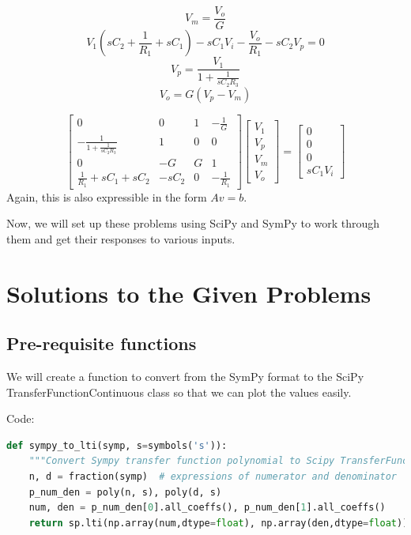 \documentclass[12pt]{article}
\begin{document}
\begin{equation}
    V_m = \frac{V_o}{G}
\end{equation}
\begin{equation}
    V_1 \left(sC_2 + \frac{1}{R_1} +sC_1 \right) - s C_1 V_i - \frac{V_o}{R_1} - s C_2 V_p = 0
\end{equation}
\begin{equation}
    V_p = \frac{V_1}{1+\frac{1}{s C_2 R_3}}
\end{equation}
\begin{equation}
    V_o = G(V_p - V_m)
\end{equation}

\begin{equation}
\begin{bmatrix}
    0 & 0 & 1 & -\frac{1}{G} \\
    -\frac{1}{1+\frac{1}{s C_2 R_3}} & 1 & 0 & 0 \\
    0 & -G & G & 1 \\
    \frac{1}{R_1}+sC_1 + sC_2 & -s C_2 & 0 & -\frac{1}{R_1}
\end{bmatrix}
\begin{bmatrix}
    V_1 \\
    V_p \\
    V_m \\
    V_o
\end{bmatrix}
=
\begin{bmatrix}
    0 \\
    0 \\
    0 \\
    s C_1 V_i
\end{bmatrix}
\end{equation}
Again, this is also expressible in the form $Av=b$.

Now, we will set up these problems using SciPy and SymPy to work through them and get their responses to various inputs.
\pagebreak
\section{Solutions to the Given Problems}
\subsection{Pre-requisite functions}

We will create a function to convert from the SymPy format to the SciPy TransferFunctionContinuous class so that we can plot the values easily.

Code:
\begin{lstlisting}[language=Python]
def sympy_to_lti(symp, s=symbols('s')):
    """Convert Sympy transfer function polynomial to Scipy TransferFunctionContinuous"""
    n, d = fraction(symp)  # expressions of numerator and denominator
    p_num_den = poly(n, s), poly(d, s)
    num, den = p_num_den[0].all_coeffs(), p_num_den[1].all_coeffs()
    return sp.lti(np.array(num,dtype=float), np.array(den,dtype=float))
\end{lstlisting}
\end{document}
